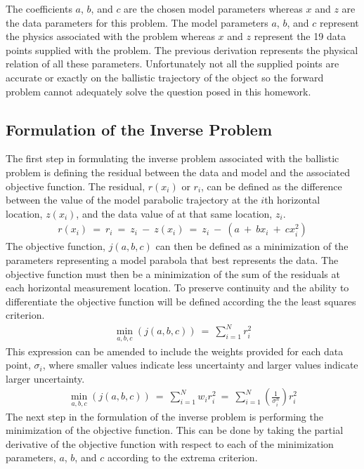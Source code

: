 \documentclass[12pt,runningheads]{article}
\begin{document}
The coefficients $a$, $b$, and $c$ are the chosen model parameters whereas $x$ and $z$ are the data parameters for this problem. The model parameters $a$, $b$, and $c$ represent the physics associated with the problem whereas $x$ and $z$ represent the 19 data points supplied with the problem. The previous derivation represents the physical relation of all these parameters. Unfortunately not all the supplied points are accurate or exactly on the ballistic trajectory of the object so the forward problem cannot adequately solve the question posed in this homework. 

\subsection*{Formulation of the Inverse Problem}
The first step in formulating the inverse problem associated with the ballistic problem is defining the residual between the data and model and the associated objective function. The residual, $r(x_{i})$ or $r_{i}$, can be defined as the difference between the value of the model parabolic trajectory at the $i$th horizontal location, $z(x_{i})$, and the data value of at that same location, $z_{i}$.
\begin{align*}
r(x_{i})\ =\ r_{i}\ =\ z_{i}\ -\ z(x_{i})\ =\ z_{i}\ -\ (a\ +\ bx_{i}\ +\ cx_{i}^{2})
\end{align*}
The objective function, $j(a,b,c)$ can then be defined as a minimization of the parameters representing a model parabola that best represents the data.
The objective function must then be a minimization of the sum of the residuals at each horizontal measurement location. To preserve continuity and the ability to differentiate the objective function will be defined according the the least squares criterion.
\begin{align*}
\min_{a,b,c}(j(a,b,c))\ =\ \sum_{i=1}^{N}r_{i}^2
\end{align*}
This expression can be amended to include the weights provided for each data point, $\sigma_{i}$, where smaller values indicate less uncertainty and larger values indicate larger uncertainty.
\begin{align*}
\min_{a,b,c}(j(a,b,c))\ =\ \sum_{i=1}^{N}w_{i}r_{i}^2\ =\ \sum_{i=1}^{N}(\frac{1}{\sigma_{i}^n})r_{i}^2
\end{align*}
The next step in the formulation of the inverse problem is performing the minimization of the objective function. This can be done by taking the partial derivative of the objective function with respect to each of the minimization parameters, $a$, $b$, and $c$ according to the extrema criterion.
\end{document}
